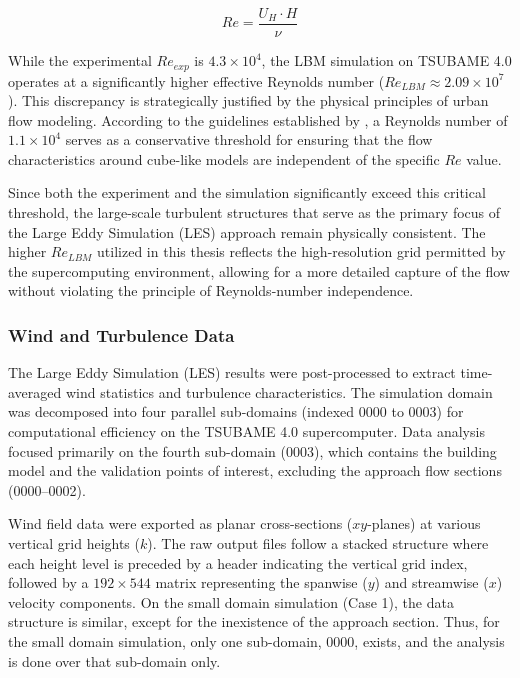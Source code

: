 \begin{equation}
    Re = \frac{U_H \cdot H}{\nu}
\end{equation}

While the experimental $Re_{exp}$ is $4.3 \times 10^{4}$, the LBM simulation on TSUBAME 4.0 operates at a significantly higher effective Reynolds number ($Re_{LBM} \approx 2.09 \times 10^{7}$). This discrepancy is strategically justified by the physical principles of urban flow modeling. According to the guidelines established by \textcite{Snyder1981}, a Reynolds number of $1.1 \times 10^{4}$ serves as a conservative threshold for ensuring that the flow characteristics around cube-like models are independent of the specific $Re$ value. 

Since both the experiment and the simulation significantly exceed this critical threshold, the large-scale turbulent structures that serve as the primary focus of the Large Eddy Simulation (LES) approach remain physically consistent. The higher $Re_{LBM}$ utilized in this thesis reflects the high-resolution grid permitted by the supercomputing environment, allowing for a more detailed capture of the flow without violating the principle of Reynolds-number independence.

\subsubsection{Wind and Turbulence Data}

The Large Eddy Simulation (LES) results were post-processed to extract time-averaged wind statistics and turbulence characteristics. The simulation domain was decomposed into four parallel sub-domains (indexed 0000 to 0003) for computational efficiency on the TSUBAME 4.0 supercomputer. Data analysis focused primarily on the fourth sub-domain (0003), which contains the building model and the validation points of interest, excluding the approach flow sections (0000–0002).

Wind field data were exported as planar cross-sections ($xy$-planes) at various vertical grid heights ($k$). The raw output files follow a stacked structure where each height level is preceded by a header indicating the vertical grid index, followed by a $192 \times 544$ matrix representing the spanwise ($y$) and streamwise ($x$) velocity components. On the small domain simulation (Case 1), the data structure is similar, except for the inexistence of the approach section. Thus, for the small domain simulation, only one sub-domain, 0000, exists, and the analysis is done over that sub-domain only.

